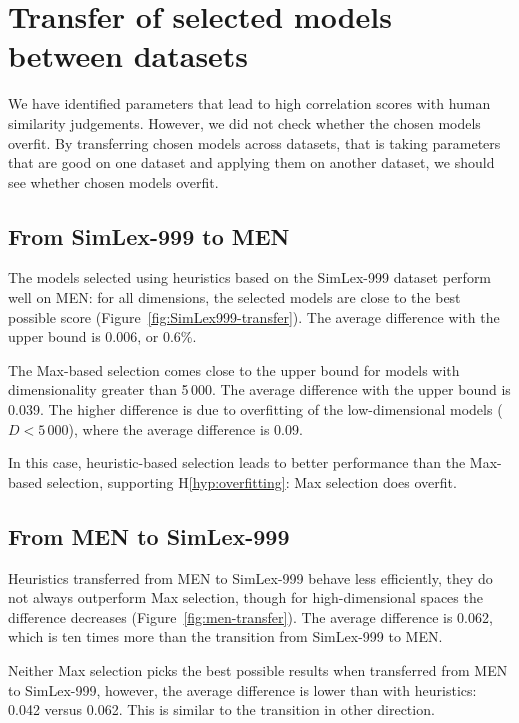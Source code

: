 \section{Transfer of selected models between datasets}
\label{sec:select-model-transf}

We have identified parameters that lead to high correlation scores with human similarity judgements. However, we did not check whether the chosen models overfit. By transferring chosen models across datasets, that is taking parameters that are good on one dataset and applying them on another dataset, we should see whether chosen models overfit. 

\subsection{From SimLex-999 to MEN}
\label{sec:simlex-men}



The models selected using heuristics based on the SimLex-999 dataset perform well on MEN: for all dimensions, the selected models are close to the best possible score (Figure~\ref{fig:SimLex999-transfer}). The average difference with the upper bound is 0.006, or 0.6\%.

The Max-based selection comes close to the upper bound for models with dimensionality greater than 5\,000. The average difference with the upper bound is 0.039. The higher difference is due to overfitting of the low-dimensional models ($D < 5\,000$), where the average difference is 0.09.

In this case, heuristic-based selection leads to better performance than the Max-based selection, supporting H\ref{hyp:overfitting}: Max selection does overfit.

\subsection{From MEN to SimLex-999}

Heuristics transferred from MEN to SimLex-999 behave less efficiently, they do not always outperform Max selection, though for high-dimensional spaces the difference decreases (Figure~\ref{fig:men-transfer}). The average difference is 0.062, which is ten times more than the transition from SimLex-999 to MEN.

Neither Max selection picks the best possible results when transferred from MEN to SimLex-999, however, the average difference is lower than with heuristics: 0.042 versus 0.062. This is similar to the transition in other direction.

